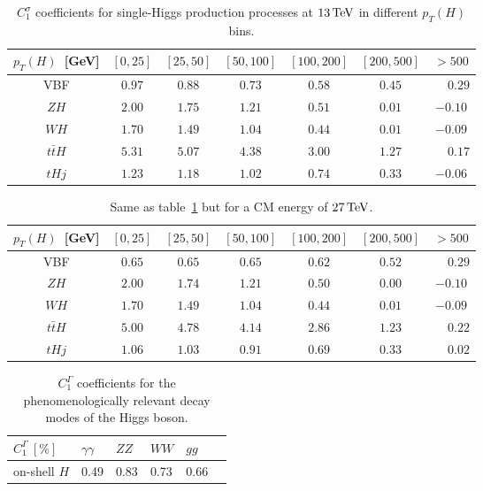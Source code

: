\begin{table}[t!]
\begin{center}
\begin{tabular}{|c |c| c| c| c| c| c|}
\hline
   $p_T(H)$~[GeV] & $[0, 25]$  & $[25, 50]$ & $[50, 100]$ & $[100, 200]$ &  $[200, 500]$ &  $>500$ \\ 
\hline
\hline
VBF & $0.97$ & $0.88$ & $0.73$ & $0.58$ & $0.45$ & $\phantom{-}0.29$ \\
\hline
$ZH$ & $2.00$ &$1.75$ & $1.21$ & $0.51$ & $0.01$ & $-0.10$ \\
\hline 
$WH$ & $1.70$ & $1.49$ & $1.04$ & $0.44$ & $0.01$ & $-0.09$ \\
\hline
$t\bar tH$ & $5.31$ & $5.07$ & $4.38$ & $3.00$ & $1.27$ & $\phantom{-}0.17$ \\
\hline
${tHj}$ & $1.23$ & $1.18$ & $1.02$ & $0.74$ & $0.33$ & $-0.06$ \\
\hline
\end{tabular}
 \caption{$C_1^{\sigma}$ coefficients for single-Higgs production processes at $13 \, {\rm TeV}$ in different $p_T(H)$ bins.}
\label{tab:c1-xs_13}
\end{center}
\end{table}

 \begin{table}[t!]
\begin{center}
\begin{tabular}{|c |c| c| c| c| c| c|}
\hline
    $p_T(H)$~[GeV] & $[0, 25]$  & $[25, 50]$ & $[50, 100]$ & $[100, 200]$ &  $[200, 500]$ &  $>500$ \\ 
\hline
\hline
VBF & $0.65$ & $0.65$ & $0.65$ & $0.62$  & $0.52$ & $\phantom{-}0.29$ \\
\hline
$ZH$ & $2.00$ & $1.74$ & $1.21$ & $0.50$ & $0.00$ & $-0.10$ \\
\hline 
$WH$ & $1.70$ & $1.49$ & $1.04$ & $0.44$ & $0.01$ & $-0.09$ \\
\hline
$t\bar tH$ & $5.00$ & $4.78$ & $4.14$ & $2.86$ & $1.23$ & $\phantom{-}0.22$ \\
\hline
${tHj}$ & $1.06$ & $1.03$ & $0.91$ & $0.69$ & $0.33$ & $\phantom{-}0.02$ \\
\hline
\end{tabular}
 \caption{Same as table~\ref{tab:c1-xs_13} but for a CM energy of $27 \, {\rm TeV}$.}
\label{tab:c1-xs_27}
\end{center}
\end{table}

\begin{table}[t!]
\begin{center}
\begin{tabular}{|l|l|l|l|l|l}
\hline 
$C_1^{\Gamma}~[\%]$	& ${\gamma\gamma}$ &${ZZ}$& ${WW}$ &${gg}$\\
\hline \hline 
on-shell $H$  &0.49 & 0.83& 0.73 & 0.66 \\
\hline 
\end{tabular}
\end{center}
\caption{ $C_1^{\Gamma}$ coefficients for the phenomenologically relevant decay modes of the Higgs boson.}
\label{c1g}
\end{table}

